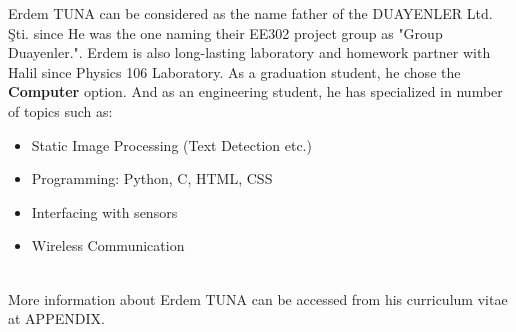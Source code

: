 \documentclass[a4paper,12pt]{article}
\begin{document}
\begin{minipage}{0.67\textwidth}
\begin{flushleft} 

	Erdem TUNA can be considered as the name father of the DUAYENLER Ltd. Şti. since He was the one naming their EE302 project group as "Group Duayenler.". Erdem is also long-lasting laboratory and homework partner with Halil since Physics 106 Laboratory. As a graduation student, he chose the \textbf{Computer} option. And as an engineering student, he has specialized in number of topics such as:
	
\begin{itemize}
	\item Static Image Processing (Text Detection etc.)
	\item Programming: Python, C, HTML, CSS 
	\item Interfacing with sensors 
	\item Wireless Communication
\end{itemize}

\end{flushleft}
\end{minipage}\\[0.4cm]

More information about Erdem TUNA can be accessed from his curriculum vitae at APPENDIX.\\[0.4cm]

\end{document}
